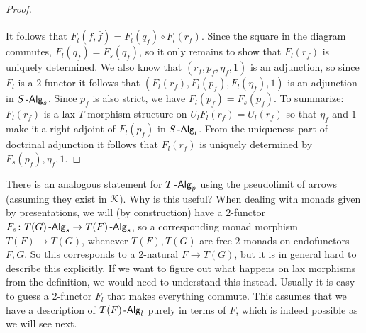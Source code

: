\documentclass[a4paper,11pt,oneside,openany]{scrbook}
\begin{document}
\begin{proof}
\[\begin{tikzcd}
\end{tikzcd}\]
It follows that $F_l(f,\bar{f})=F_l(q_f)\circ F_l(r_f)$. Since the square in the diagram commutes, $F_l(q_f)=F_s(q_f)$, so it only remains to show that $F_l(r_f)$ is uniquely determined. We also know that $(r_f, p_f, \eta_f,1)$ is an adjunction, so since $F_l$ is a $2$-functor it follows that $(F_l(r_f), F_l(p_f), F_l(\eta_f), 1)$ is an adjunction in $S\operatorname{-\mathsf{Alg}}_s$. Since $p_f$ is also strict, we have $F_l(p_f)=F_s(p_f)$. To summarize: $F_l(r_f)$ is a lax $T$-morphism structure on $U_lF_l(r_f)=U_l(r_f)$ so that $\eta_f$ and $1$ make it a right adjoint of $F_l(p_f)$ in $S\operatorname{-\mathsf{Alg}}_l$. From the uniqueness part of doctrinal adjunction it follows that $F_l(r_f)$ is uniquely determined by $F_s(p_f), \eta_f, 1$. 
\end{proof}  
\begin{rmk}
    There is an analogous statement for $T\operatorname{-\mathsf{Alg}}_p$ using the pseudolimit of arrows (assuming they exist in $\operatorname{\mathcal{K}}$). Why is this useful? When dealing with monads given by presentations, we will (by construction) have a $2$-functor $F_s\colon T(G)\operatorname{-\mathsf{Alg}}_s\to T(F)\operatorname{-\mathsf{Alg}}_s$, so a corresponding monad morphism $T(F)\to T(G)$, whenever $T(F), T(G)$ are free $2$-monads on endofunctors $F, G$. So this corresponds to a $2$-natural $F\to T(G)$, but it is in general hard to describe this explicitly. If we want to figure out what happens on lax morphisms from the definition, we would need to understand this instead. Usually it is easy to guess a $2$-functor $F_l$ that makes everything commute. This assumes that we have a description of $T(F)\operatorname{-\mathsf{Alg}}_l$ purely in terms of $F$, which is indeed possible as we will see next.
\end{rmk}
\end{document}
